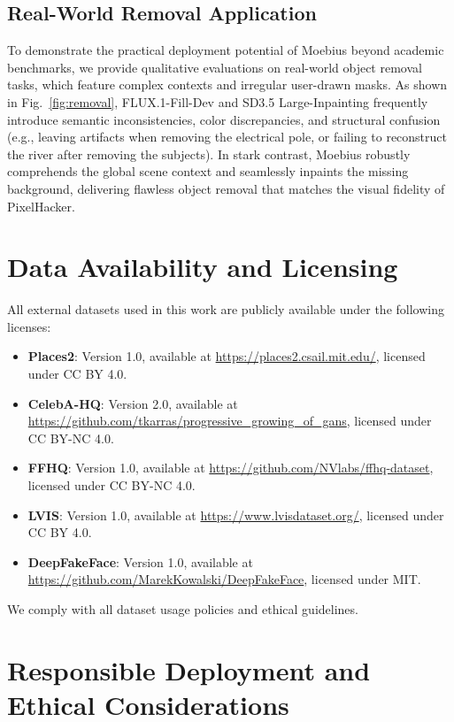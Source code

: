 \documentclass[runningheads]{llncs}
\begin{document}
\vspace{-0.5em}
\subsection{Real-World Removal Application}\label{subsec:real_world}
To demonstrate the practical deployment potential of Moebius beyond academic benchmarks, we provide qualitative evaluations on real-world object removal tasks, which feature complex contexts and irregular user-drawn masks. As shown in Fig.~\ref{fig:removal}, FLUX.1-Fill-Dev and SD3.5 Large-Inpainting frequently introduce semantic inconsistencies, color discrepancies, and structural confusion (e.g., leaving artifacts when removing the electrical pole, or failing to reconstruct the river after removing the subjects). In stark contrast, Moebius robustly comprehends the global scene context and seamlessly inpaints the missing background, delivering flawless object removal that matches the visual fidelity of PixelHacker.

\vspace{-0.5em}
\section{Data Availability and Licensing}

All external datasets used in this work are publicly available under the following licenses:

\begin{itemize}
  \item \textbf{Places2}: Version 1.0, available at \url{https://places2.csail.mit.edu/}, licensed under CC BY 4.0.
  \item \textbf{CelebA-HQ}: Version 2.0, available at \url{https://github.com/tkarras/progressive_growing_of_gans}, licensed under CC BY-NC 4.0.
  \item \textbf{FFHQ}: Version 1.0, available at \url{https://github.com/NVlabs/ffhq-dataset}, licensed under CC BY-NC 4.0.
  \item \textbf{LVIS}: Version 1.0, available at \url{https://www.lvisdataset.org/}, licensed under CC BY 4.0.
  \item \textbf{DeepFakeFace}: Version 1.0, available at \url{https://github.com/MarekKowalski/DeepFakeFace}, licensed under MIT.
\end{itemize}

We comply with all dataset usage policies and ethical guidelines.


\section{Responsible Deployment and Ethical Considerations}
\end{document}
